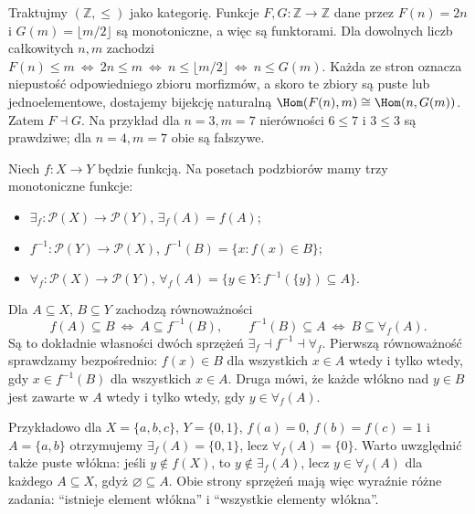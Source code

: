 \begin{przyklad}\label{przyklad:adj-poset}
Traktujmy $(\mathbb Z,\leq)$ jako kategorię. Funkcje $F,G:\mathbb Z\to\mathbb Z$ dane przez $F(n)=2n$ i $G(m)=\lfloor m/2\rfloor$ są monotoniczne, a więc są funktorami. Dla dowolnych liczb całkowitych $n,m$ zachodzi
$F(n)\leq m\ \Longleftrightarrow\ 2n\leq m\ \Longleftrightarrow\ n\leq\lfloor m/2\rfloor\ \Longleftrightarrow\ n\leq G(m)$.
Każda ze stron oznacza niepustość odpowiedniego zbioru morfizmów, a skoro te zbiory są puste lub jednoelementowe, dostajemy bijekcję naturalną $\Hom(F(n),m)\cong\Hom(n,G(m))$. Zatem $F\dashv G$. Na przykład dla $n=3,m=7$ nierówności $6\leq7$ i $3\leq3$ są prawdziwe; dla $n=4,m=7$ obie są fałszywe.
\end{przyklad}

\begin{przyklad}\label{przyklad:adj-inverse-image}
Niech $f:X\to Y$ będzie funkcją. Na posetach podzbiorów mamy trzy monotoniczne funkcje:
\begin{itemize}
\item $\exists_f:\mathcal P(X)\to\mathcal P(Y)$, $\exists_f(A)=f(A)$;
\item $f^{-1}:\mathcal P(Y)\to\mathcal P(X)$, $f^{-1}(B)=\{x:f(x)\in B\}$;
\item $\forall_f:\mathcal P(X)\to\mathcal P(Y)$, $\forall_f(A)=\{y\in Y:f^{-1}(\{y\})\subseteq A\}$.
\end{itemize}
Dla $A\subseteq X$, $B\subseteq Y$ zachodzą równoważności
\[
f(A)\subseteq B\ \Longleftrightarrow\ A\subseteq f^{-1}(B),\qquad
f^{-1}(B)\subseteq A\ \Longleftrightarrow\ B\subseteq\forall_f(A).
\]
Są to dokładnie własności dwóch sprzężeń $\exists_f\dashv f^{-1}\dashv\forall_f$. Pierwszą równoważność sprawdzamy bezpośrednio: $f(x)\in B$ dla wszystkich $x\in A$ wtedy i tylko wtedy, gdy $x\in f^{-1}(B)$ dla wszystkich $x\in A$. Druga mówi, że każde włókno nad $y\in B$ jest zawarte w $A$ wtedy i tylko wtedy, gdy $y\in\forall_f(A)$.

Przykładowo dla $X=\{a,b,c\}$, $Y=\{0,1\}$, $f(a)=0$, $f(b)=f(c)=1$ i $A=\{a,b\}$ otrzymujemy $\exists_f(A)=\{0,1\}$, lecz $\forall_f(A)=\{0\}$. Warto uwzględnić także puste włókna: jeśli $y\notin f(X)$, to $y\notin\exists_f(A)$, lecz $y\in\forall_f(A)$ dla każdego $A\subseteq X$, gdyż $\varnothing\subseteq A$. Obie strony sprzężeń mają więc wyraźnie różne zadania: ``istnieje element włókna'' i ``wszystkie elementy włókna''.
\end{przyklad}

